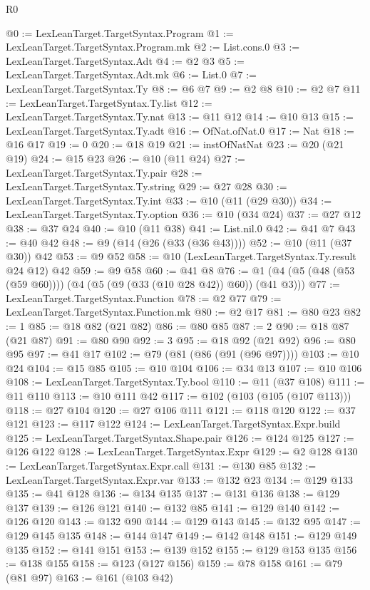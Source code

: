 \begin{lexlean}{R0}
\begin{coremodule}
@0 := LexLeanTarget.TargetSyntax.Program
@1 := LexLeanTarget.TargetSyntax.Program.mk
@2 := List.cons.{0}
@3 := LexLeanTarget.TargetSyntax.Adt
@4 := @2 @3
@5 := LexLeanTarget.TargetSyntax.Adt.mk
@6 := List.{0}
@7 := LexLeanTarget.TargetSyntax.Ty
@8 := @6 @7
@9 := @2 @8
@10 := @2 @7
@11 := LexLeanTarget.TargetSyntax.Ty.list
@12 := LexLeanTarget.TargetSyntax.Ty.nat
@13 := @11 @12
@14 := @10 @13
@15 := LexLeanTarget.TargetSyntax.Ty.adt
@16 := OfNat.ofNat.{0}
@17 := Nat
@18 := @16 @17
@19 := 0
@20 := @18 @19
@21 := instOfNatNat
@23 := @20 (@21 @19)
@24 := @15 @23
@26 := @10 (@11 @24)
@27 := LexLeanTarget.TargetSyntax.Ty.pair
@28 := LexLeanTarget.TargetSyntax.Ty.string
@29 := @27 @28
@30 := LexLeanTarget.TargetSyntax.Ty.int
@33 := @10 (@11 (@29 @30))
@34 := LexLeanTarget.TargetSyntax.Ty.option
@36 := @10 (@34 @24)
@37 := @27 @12
@38 := @37 @24
@40 := @10 (@11 @38)
@41 := List.nil.{0}
@42 := @41 @7
@43 := @40 @42
@48 := @9 (@14 (@26 (@33 (@36 @43))))
@52 := @10 (@11 (@37 @30)) @42
@53 := @9 @52
@58 := @10 (LexLeanTarget.TargetSyntax.Ty.result @24 @12) @42
@59 := @9 @58
@60 := @41 @8
@76 := @1 (@4 (@5 (@48 (@53 (@59 @60)))) (@4 (@5 (@9 (@33 (@10 @28 @42)) @60)) (@41 @3)))
@77 := LexLeanTarget.TargetSyntax.Function
@78 := @2 @77
@79 := LexLeanTarget.TargetSyntax.Function.mk
@80 := @2 @17
@81 := @80 @23
@82 := 1
@85 := @18 @82 (@21 @82)
@86 := @80 @85
@87 := 2
@90 := @18 @87 (@21 @87)
@91 := @80 @90
@92 := 3
@95 := @18 @92 (@21 @92)
@96 := @80 @95
@97 := @41 @17
@102 := @79 (@81 (@86 (@91 (@96 @97))))
@103 := @10 @24
@104 := @15 @85
@105 := @10 @104
@106 := @34 @13
@107 := @10 @106
@108 := LexLeanTarget.TargetSyntax.Ty.bool
@110 := @11 (@37 @108)
@111 := @11 @110
@113 := @10 @111 @42
@117 := @102 (@103 (@105 (@107 @113)))
@118 := @27 @104
@120 := @27 @106 @111
@121 := @118 @120
@122 := @37 @121
@123 := @117 @122
@124 := LexLeanTarget.TargetSyntax.Expr.build
@125 := LexLeanTarget.TargetSyntax.Shape.pair
@126 := @124 @125
@127 := @126 @122
@128 := LexLeanTarget.TargetSyntax.Expr
@129 := @2 @128
@130 := LexLeanTarget.TargetSyntax.Expr.call
@131 := @130 @85
@132 := LexLeanTarget.TargetSyntax.Expr.var
@133 := @132 @23
@134 := @129 @133
@135 := @41 @128
@136 := @134 @135
@137 := @131 @136
@138 := @129 @137
@139 := @126 @121
@140 := @132 @85
@141 := @129 @140
@142 := @126 @120
@143 := @132 @90
@144 := @129 @143
@145 := @132 @95
@147 := @129 @145 @135
@148 := @144 @147
@149 := @142 @148
@151 := @129 @149 @135
@152 := @141 @151
@153 := @139 @152
@155 := @129 @153 @135
@156 := @138 @155
@158 := @123 (@127 @156)
@159 := @78 @158
@161 := @79 (@81 @97)
@163 := @161 (@103 @42)

\end{coremodule}
\end{lexlean}
